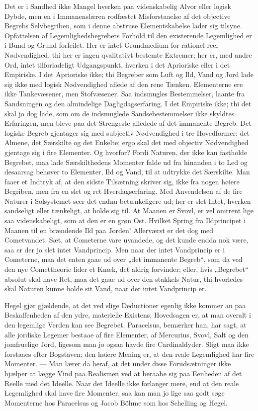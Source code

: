 \documentclass[12pt,a4paper]{book}
\begin{document}
Det er i Sandhed ikke Mangel hverken paa videnskabelig Alvor eller
logisk Dybde, men en i Immanenslæren rodfæstet Misforstaaelse af det
objective Begrebs Selvbegriben, som i denne abstruse Elementskabelse
lader sig tilsyne. Opfattelsen af Legemlighedsbegrebets Forhold til
den existerende Legemlighed er i Bund og Grund forfeilet. Her er intet
Grundmedium for rationel-reel Nødvendighed, thi her er ingen
qvalitativt bestemte Extremer; her er, med andre Ord, intet
tilforladeligt Udgangspunkt, hverken i det Aprioriske eller i det
Empiriske. I det Aprioriske ikke; thi Begreber som Luft og Ild, Vand
og Jord lade sig ikke med logisk Nødvendighed aflede af den rene
Tænken. Elementerne ere ikke Tankevæsener, men Stofvæsener. Saa
indsmugles Bestemmelser, laante fra Sandsningen og den almindelige
Dagligdagserfaring. I det Empiriske ikke; thi
det skal jo dog lade, som om de indsmuglede Sandsebestemmelser ikke
skyldtes Erfaringen, men bleve paa det Strengeste afledede af det
immanente Begreb. Det logiske Begreb gjentager sig med subjectiv
Nødvendighed i tre Hovedformer: det Almene, det Særskilte og det
Enkelte; ergo skal det med objectiv Nødvendighed gjentage sig i fire
Elementer. Og hvorfor? Fordi Naturen, der ikke kan fastholde
Begrebet, maa lade Særskilthedens Momenter falde ud fra hinanden i to
Led og desaarsag behøver to Elementer, Ild og Vand, til at udtrykke
det Særskilte. Man faaer et Indtryk af, at den sidste Tilsætning
skriver sig, ikke fra nogen høiere Begriben, men fra en slet og ret
Hverdagserfaring. Med Anvendelsen af de fire Naturer i Solsystemet
seer det endnu betænkeligere ud; her er slet Intet, hverken sandseligt
eller tænkeligt, at holde sig til. At Maanen er Svovl, er vel omtrent
lige saa videnskabeligt, som at den er en grøn Ost. Hvilket Spring
fra Ildprincipet i Maanen til en brændende Ild paa Jorden!
Allerværst er det dog med Cometvandet. Sæt, at Cometerne vare
uvandede, og det kunde endda nok være, saa er der jo slet intet
Vandprincip. Men naar der intet Vandprincip er i Cometerne, maa det
enten gaae ud over „det immanente Begreb“, som da ved den nye
Comettheorie lider et Knæk, det aldrig forvinder; eller, hvis
„Begrebet“ absolut skal have Ret, maa det gaae ud over den stakkels
Natur, thi hvorledes skal Naturen kunne holde sit Vand, naar der intet
Vandprincip er.

Hegel gjør gjældende, at det ved slige Deductioner egenlig ikke
kommer an paa Beskaffenheden af den ydre, materielle Existens;
Hovedsagen er, at man overalt i den legemlige Verden kan see Begrebet.
Paracelsus, bemærker han, har sagt, at alle jordiske Legemer bestaae
af fire Elementer, af Mercurius, Svovl, Salt og den jomfruelige Jord,
ligesom man jo ogsaa havde fire Cardinaldyder. Sligt maa ikke
forstaaes efter Bogstaven; den høiere Mening er, at den
reale Legemlighed har fire Momenter. --- Man lærer da heraf, at det
under disse Forudsætninger ikke hjælper at lægge Vind paa Realismen
ved at beraabe sig paa Eenheden af det Reelle med det Ideelle. Naar
det Ideelle ikke forlanger mere, end at den reale Legemlighed skal
have fire Momenter, saa kan man jo lige saa godt søge Momenterne hos
Paracelsus og Jacob Böhme som hos Schelling og Hegel.
\end{document}
